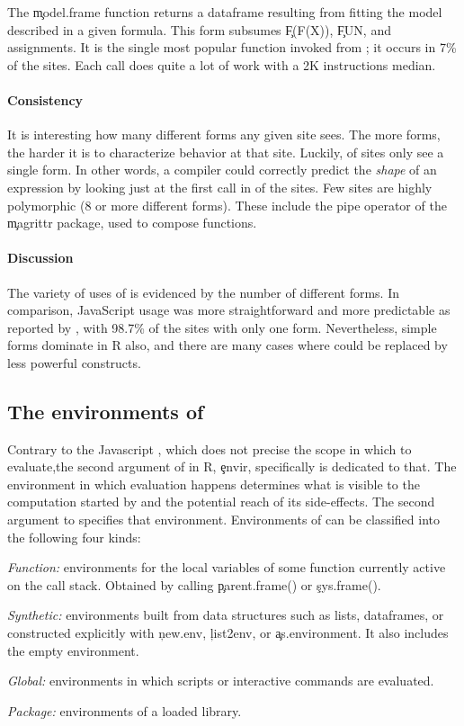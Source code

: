 \documentclass[review,screen,acmsmall,anonymous=true]{acmart}
\begin{document}
\medskip\noindent{} The \c{model.frame} function
returns a dataframe resulting from fitting the model described in a given
formula. This form subsumes \c{F(F(X))}, \c{FUN}, and assignments. It is the
single most popular function invoked from \eval; it occurs in 7\% of the sites.
Each call does quite a lot of work with a 2K instructions median.

\paragraph{Consistency} It is interesting how many different
forms any given site sees. The more forms, the harder it is to characterize
behavior at that site. Luckily, \packageNbOneMinimizedPercent of sites only see
a single form. In other words, a compiler could correctly predict the
\emph{shape} of an expression by looking just at the first call in
\packageNbOneMinimizedPercent of the sites. Few sites are highly polymorphic (8
or more different forms). These include the pipe operator of the \c{magrittr}
package, used to compose functions.

\paragraph{Discussion} The variety of uses of \eval is evidenced by the number
of different forms. In comparison, JavaScript \eval usage was more
straightforward and more predictable as reported by \citet{oopsla12b}, with
98.7\% of the sites with only one form. Nevertheless, simple forms dominate in R
also, and there are many cases where \eval could be replaced by less powerful
constructs.


\subsection{The environments of \eval}\label{sec:env}

Contrary to the Javascript \eval, which does not precise the scope in which to evaluate,the second argument of \eval in R, \c{envir}, specifically is dedicated to that.
The environment in which evaluation happens determines what is visible to the
computation started by \eval and the potential reach of its side-effects. The
second argument to \eval specifies that environment. Environments of \eval can be
classified into the following four kinds:

\begin{compactitem}[---]
\item \emph{Function:} environments for the local variables of some function
  currently active on the call stack. Obtained by calling \c{parent.frame()} or
  \c{sys.frame()}.
\item \emph{Synthetic:} environments built from data structures such as lists,
  dataframes, or constructed explicitly with \c{new.env}, \c{list2env}, or
  \c{as.environment}. It also includes the empty environment.
\item \emph{Global:}  environments in which scripts or interactive commands
  are evaluated.
\item \emph{Package:}  environments of a loaded library.
\end{compactitem}
\end{document}
